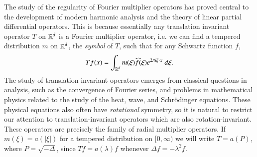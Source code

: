 The study of the regularity of Fourier multiplier operators has proved central to the development of modern harmonic analysis and the theory of linear partial differential operators. This is because essentially any translation invariant operator $T$ on $\operatorname{\mathbb{R}}^d$ is a Fourier multiplier operator, i.e. we can find a tempered distribution $m$ on $\operatorname{\mathbb{R}}^d$, the \emph{symbol} of $T$, such that for any Schwartz function $f$,
%
\begin{equation}
  Tf(x) = \int_{\operatorname{\mathbb{R}}^d} m(\xi) \widehat{f}(\xi) e^{2 \pi i \xi \cdot x}\; d\xi.
\end{equation}
%
%
%
%
%
The study of translation invariant operators emerges from classical questions in analysis, such as the convergence of Fourier series, and problems in mathematical physics related to the study of the heat, wave, and Schr\"{o}dinger equations. These physical equations also often have \emph{rotational} symmetry, so it is natural to restrict our attention to translation-invariant operators which are also rotation-invariant. These operators are precisely the family of radial multiplier operators. If $m(\xi) = a(|\xi|)$ for a tempered distribution on $[0,\infty)$ we will write $T = a(P)$, where $P = \sqrt{-\Delta}$, since $Tf = a(\lambda) f$ whenever $\Delta f = - \lambda^2 f$.
%
%
%
%
%
%

